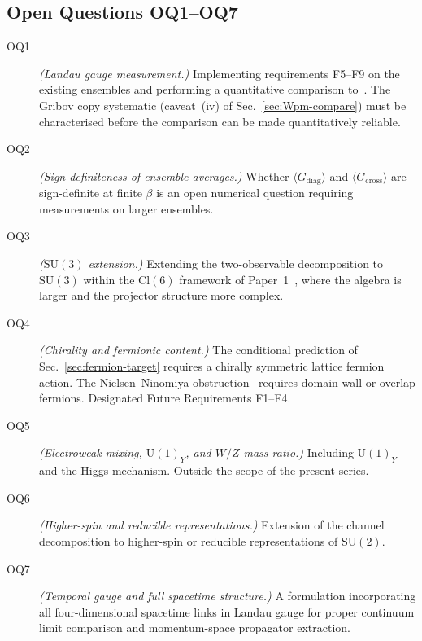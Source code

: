 \documentclass[12pt]{article}
\numberwithin{equation}{section}
\theoremstyle{plain}
\theoremstyle{definition}
\theoremstyle{remark}
\newcommand{\cl}{\mathrm{Cl}}              %
\newcommand{\su}{\mathrm{SU}}              %
\newcommand{\uu}{\mathrm{U}}               %
\newcommand{\Gdiag}{G_{\mathrm{diag}}}     %
\newcommand{\Gcross}{G_{\mathrm{cross}}}   %
\begin{document}
	\subsection{Open Questions OQ1--OQ7}
	\label{sec:disc-OQ}
	
	\begin{description}
		\item[OQ1] \emph{(Landau gauge measurement.)}
		Implementing requirements F5--F9 on the existing ensembles and
		performing a quantitative comparison to~\cite{%
			CucchieriMendes2008,Bogolubsky}.  The Gribov copy systematic
		(caveat~(iv) of Sec.~\ref{sec:Wpm-compare}) must be characterised
		before the comparison can be made quantitatively reliable.
		
		\item[OQ2] \emph{(Sign-definiteness of ensemble averages.)}
		Whether $\langle\Gdiag\rangle$ and $\langle\Gcross\rangle$ are
		sign-definite at finite $\beta$ is an open numerical question
		requiring measurements on larger ensembles.
		
		\item[OQ3] \emph{($\su(3)$ extension.)}
		Extending the two-observable decomposition to $\su(3)$ within
		the $\cl(6)$ framework of Paper~1~\cite{FirestoneP1}, where the
		algebra is larger and the projector structure more complex.
		
		\item[OQ4] \emph{(Chirality and fermionic content.)}
		The conditional prediction of Sec.~\ref{sec:fermion-target}
		requires a chirally symmetric lattice fermion action.  The
		Nielsen--Ninomiya
		obstruction~\cite{NielsenNinomiya1981a,NielsenNinomiya1981b}
		requires domain wall or overlap fermions.  Designated Future
		Requirements F1--F4.
		
		\item[OQ5] \emph{(Electroweak mixing, $\uu(1)_Y$, and $W/Z$ mass
			ratio.)}
		Including $\uu(1)_Y$ and the Higgs mechanism.  Outside the scope
		of the present series.
		
		\item[OQ6] \emph{(Higher-spin and reducible representations.)}
		Extension of the channel decomposition to higher-spin or
		reducible representations of $\su(2)$.
		
		\item[OQ7] \emph{(Temporal gauge and full spacetime structure.)}
		A formulation incorporating all four-dimensional spacetime links
		in Landau gauge for proper continuum limit comparison and
		momentum-space propagator extraction.
	\end{description}
	
\end{document}
